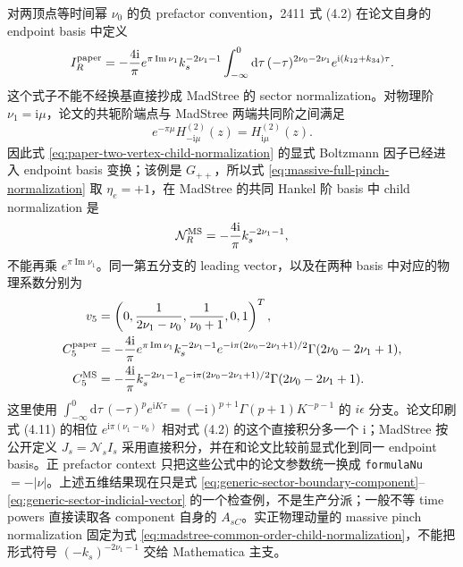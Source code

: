 \documentclass[11pt,a4paper]{ctexart}
\newcommand{\dd}{\mathrm d}
\newcommand{\ii}{\mathrm i}
\newcommand{\cN}{\mathcal N}
\begin{document}
对两顶点等时间幂 $\nu_0$ 的负 prefactor convention，2411 式 (4.2) 在论文自身的 endpoint basis 中定义
\begin{equation}
 I_R^{\rm paper}=-\frac{4\ii}{\pi}e^{\pi\operatorname{Im}\nu_1}k_s^{-2\nu_1-1}
 \int_{-\infty}^{0}\dd\tau\,(-\tau)^{2\nu_0-2\nu_1}
 e^{\ii(k_{12}+k_{34})\tau}.
 \label{eq:paper-two-vertex-child-normalization}
\end{equation}
这个式子不能不经换基直接抄成 MadStree 的 sector normalization。对物理阶 $\nu_1=\ii\mu$，论文的共轭阶端点与 MadStree 两端共同阶之间满足
\begin{equation}
 e^{-\pi\mu}H^{(2)}_{-\ii\mu}(z)=H^{(2)}_{\ii\mu}(z).
 \label{eq:paper-endpoint-to-common-hankel-order}
\end{equation}
因此式 \eqref{eq:paper-two-vertex-child-normalization} 的显式 Boltzmann 因子已经进入 endpoint basis 变换；该例是 $G_{++}$，所以式 \eqref{eq:massive-full-pinch-normalization} 取 $\eta_e=+1$，在 MadStree 的共同 Hankel 阶 basis 中 child normalization 是
\begin{equation}
 \cN_R^{\rm MS}=-\frac{4\ii}{\pi}k_s^{-2\nu_1-1},
 \label{eq:madstree-common-order-child-normalization}
\end{equation}
不能再乘 $e^{\pi\operatorname{Im}\nu_1}$。同一第五分支的 leading vector，以及在两种 basis 中对应的物理系数分别为
\begin{align}
 v_5&=\left(0,\frac{1}{2\nu_1-\nu_0},\frac{1}{\nu_0+1},0,1\right)^T,
 \notag\\
 C_5^{\rm paper}&=-\frac{4\ii}{\pi}e^{\pi\operatorname{Im}\nu_1}
 k_s^{-2\nu_1-1}e^{-\ii\pi(2\nu_0-2\nu_1+1)/2}
 \Gamma(2\nu_0-2\nu_1+1),
 \notag\\
 C_5^{\rm MS}&=-\frac{4\ii}{\pi}
 k_s^{-2\nu_1-1}e^{-\ii\pi(2\nu_0-2\nu_1+1)/2}
 \Gamma(2\nu_0-2\nu_1+1).
 \label{eq:paper-two-vertex-contact-boundary}
\end{align}
这里使用 $\int_{-\infty}^{0}\dd\tau\,(-\tau)^p e^{\ii K\tau}=(-\ii)^{p+1}\Gamma(p+1)K^{-p-1}$ 的 $i\epsilon$ 分支。论文印刷式 (4.11) 的相位 $e^{\ii\pi(\nu_1-\nu_0)}$ 相对式 (4.2) 的这个直接积分多一个 $\ii$；MadStree 按公开定义 $J_s=\cN_s I_s$ 采用直接积分，并在和论文比较前显式化到同一 endpoint basis。正 prefactor context 只把这些公式中的论文参数统一换成 \texttt{formulaNu}$=-|\nu|$。上述五维结果现在只是式 \eqref{eq:generic-sector-boundary-component}--\eqref{eq:generic-sector-indicial-vector} 的一个检查例，不是生产分派；一般不等 time powers 直接读取各 component 自身的 $A_{sC}$。实正物理动量的 massive pinch normalization 固定为式 \eqref{eq:madstree-common-order-child-normalization}，不能把形式符号 $(-k_s)^{-2\nu_1-1}$ 交给 Mathematica 主支。
\end{document}
